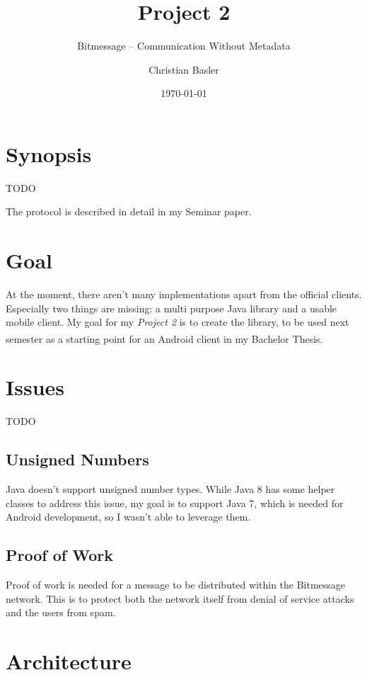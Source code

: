 \documentclass{bfh}
\title{Project 2}
\subtitle{Bitmessage -- Communication Without Metadata}
\author{Christian Basler}
\date{\today}
\begin{document}
  \maketitle

  \tableofcontents

  \section{Synopsis}

  TODO


  

  The protocol is described in detail in my Seminar paper.


  \section{Goal}

  At the moment, there aren't many implementations apart from the official clients. Especially two things are missing: a multi purpose Java library and a usable mobile client. My goal for my \textit{Project 2} is to create the library, to be used next semester as a starting point for an Android\textsuperscript{\texttrademark} client in my Bachelor Thesis.


  \section{Issues}

  TODO


  \subsection{Unsigned Numbers}

  Java doesn't support unsigned number types. While Java 8 has some helper classes to address this issue, my goal is to support Java 7, which is needed for Android development, so I wasn't able to leverage them.

  \subsection{Proof of Work}

  Proof of work is needed for a message to be distributed within the Bitmessage network. This is to protect both the network itself from denial of service attacks and the users from spam.


  \section{Architecture}
\end{document}
